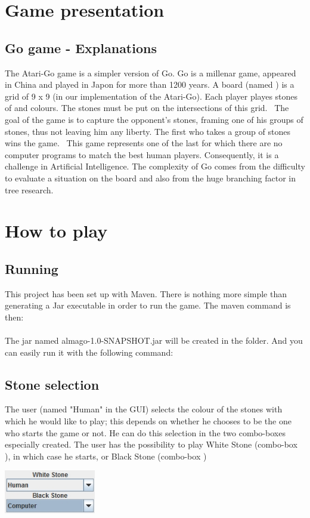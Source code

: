 \documentclass[a4paper,10pt]{report}
\newcommand{\empha}[1]{\textbf{\color{blue}{#1}}}
\begin{document}
						


	\chapter*{Game presentation}
		\section{Go game - Explanations}
	The Atari-Go game is a simpler version of Go. Go is a millenar game, appeared in China and played in Japon for more than 1200 years. A board (named \empha{Goban}) is a grid of 9 x 9 (in our implementation of the Atari-Go). Each player playes stones of \empha{White} and \empha{Black} colours. The stones must be put on the intersections of this grid.
\
The goal of the game is to capture the opponent's stones, framing one of his groups of stones, thus not leaving him any liberty. The first who takes a group of stones wins the game.
\
This game represents one of the last for which there are no computer programs to match the best human players. Consequently, it is a challenge in Artificial Intelligence. The complexity of Go comes from the difficulty to evaluate a situation on the board and also from the huge branching factor in tree research.



	\chapter*{How to play}
		\section{Running}
			This project has been set up with Maven. There is nothing more simple than generating a Jar executable in order to run the game. The maven command is then:
			\\
			\empha{mvn package}
			\\
			The jar named almago-1.0-SNAPSHOT.jar will be created in the \empha{target} folder. And you can easily run it with the following command:
			\\
			\empha{java -jar almago-1.0-SNAPSHOT.jar}

		\section{Stone selection}
			The user (named "Human" in the GUI) selects the colour of the stones with which he would like to play; this depends on whether he chooses to be the one who starts the game or not. He can do this selection in the two combo-boxes especially created.
The user has the possibility to play White Stone (combo-box \empha{White Stone}), in which case he starts, or Black Stone (combo-box \empha{Black Stones})
			\\
			\begin{center}
				\includegraphics[width=0.30\textwidth] {img/StoneSelect.jpg}
			\end{center}
			
\end{document}
